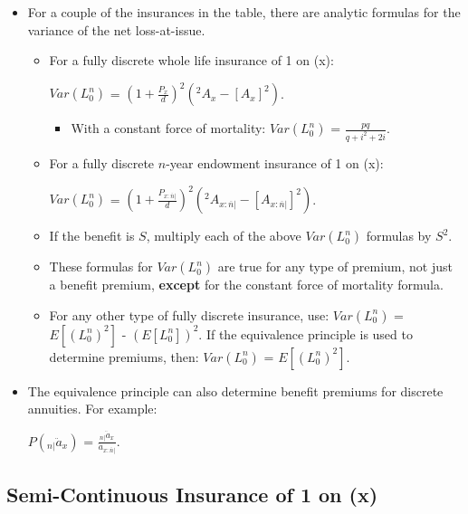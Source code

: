 \documentclass[]{book}
\providecommand{\tightlist}{%
  \setlength{\itemsep}{0pt}\setlength{\parskip}{0pt}}
\begin{document}
\begin{itemize}
\item
  For a couple of the insurances in the table, there are analytic
  formulas for the variance of the net loss-at-issue.

  \begin{itemize}
  \item
    For a fully discrete whole life insurance of 1 on (x):

    \(Var(L^n_0)\) = \((1 + \frac{P_x}{d})^2\)\((^2A_x - [A_x]^2)\).

    \begin{itemize}
    \tightlist
    \item
      With a constant force of mortality: \(Var(L^n_0)\) =
      \(\frac{pq}{q + i^2 + 2i}\).
    \end{itemize}
  \item
    For a fully discrete \(n\)-year endowment insurance of 1 on (x):

    \(Var(L^n_0)\) =
    \((1 + \frac{P_{x:\overline{n}|}}{d})^2\)\((^2 A_{x:\overline{n}|} - [A_{x:\overline{n}|}]^2)\).
  \item
    If the benefit is \(S\), multiply each of the above \(Var(L^n_0)\)
    formulas by \(S^2\).
  \item
    These formulas for \(Var(L^n_0)\) are true for any type of premium,
    not just a benefit premium, \textbf{except} for the constant force
    of mortality formula.
  \item
    For any other type of fully discrete insurance, use: \(Var(L^n_0)\)
    = \(E[(L^n_0)^2]\) - \((E[L^n_0])^2\). If the equivalence principle
    is used to determine premiums, then: \(Var(L^n_0)\) =
    \(E[(L^n_0)^2]\).
  \end{itemize}
\item
  The equivalence principle can also determine benefit premiums for
  discrete annuities. For example:

  \(P({}_{n|}\ddot{a}_x)\) =
  \(\frac{{}_{n|}\ddot{a}_x}{\ddot{a}_{x:\overline{n}|}}\).
\end{itemize}

\subsection{Semi-Continuous Insurance of 1 on
(x)}\label{semi-continuous-insurance-of-1-on-x}
\end{document}
